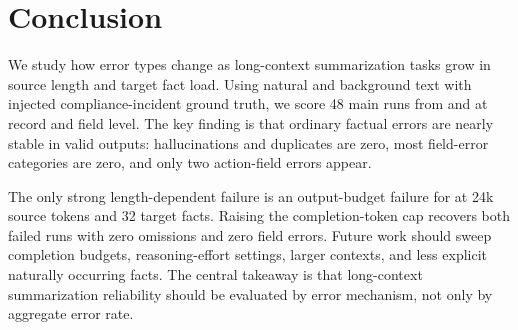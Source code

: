 \section{Conclusion}
\label{sec:conclusion}

We study how error types change as long-context summarization tasks grow in source length and target fact load. Using natural \qmsum and \govreport background text with injected compliance-incident ground truth, we score 48 main runs from \gptfourmini and \gptfivemini at record and field level. The key finding is that ordinary factual errors are nearly stable in valid outputs: hallucinations and duplicates are zero, most field-error categories are zero, and only two action-field errors appear.

The only strong length-dependent failure is an output-budget failure for \gptfivemini at 24k source tokens and 32 target facts. Raising the completion-token cap recovers both failed runs with zero omissions and zero field errors. Future work should sweep completion budgets, reasoning-effort settings, larger contexts, and less explicit naturally occurring facts. The central takeaway is that long-context summarization reliability should be evaluated by error mechanism, not only by aggregate error rate.
